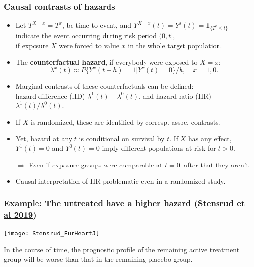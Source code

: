 \documentclass[12pt,dvipsnames,t,aspectratio=169, handout%
]{beamer}
\begin{document}
\begin{frame}
\frametitle{\large Causal contrasts of hazards}

\begin{itemize}
\item
  Let $T^{X=x} = T^x$, be time to event, and 
$Y^{X=x}(t) = Y^x(t) = {\mathbf 1}_{\{T^x \leq t\}}$ 
indicate the event occurring during risk period $(0,t]$, \\ if exposure $X$ were forced
to value $x$ in the {whole target population}.
\pause 
\medskip
\item
The \textbf{counterfactual hazard}, if everybody were exposed to $X=x$:
$$ \lambda^x(t) %
 \approx P\{ Y^{x}(t + h)=1 | Y^{x}(t) = 0 \}/h, \quad x = 1,0. $$
\item
Marginal contrasts of these counterfactuals can be defined: \\ 
hazard difference (HD) $\lambda^1(t) - \lambda^0(t)$,
and hazard ratio (HR) ${\lambda^1(t)}/{ \lambda^0(t) }$.
\pause
\medskip
\item
If $X$ is randomized, these are identified by corresp. assoc. contrasts. 
\medskip					
\item  
Yet, hazard at any $t$ is \underline{conditional} on survival by $t$. 
If $X$ has any effect, 
 $Y^{1}(t) =0$ and $Y^{0}(t) =0$ imply
different populations at risk for $t>0$. 
\pause
\item[$\Rightarrow$] Even if exposure groups were comparable at $t=0$,  after that they aren't.
\medskip
\item 
Causal interpretation of HR problematic even in a randomized study.  
\end{itemize}
\end{frame}

\begin{frame}
\frametitle{Example: The untreated have a higher hazard 
     {\small (\href{https://doi.org/10.1093/eurheartj/ehy770}{Stensrud et al 2019})} }
\begin{center}		
\texttt{[image: Stensrud\_EurHeartJ]}
\end{center}
\bi
\item
In the course of time, the prognostic profile of the remaining active treatment group will be worse
than that in the remaining placebo group.
\ei
\end{frame}
\end{document}
